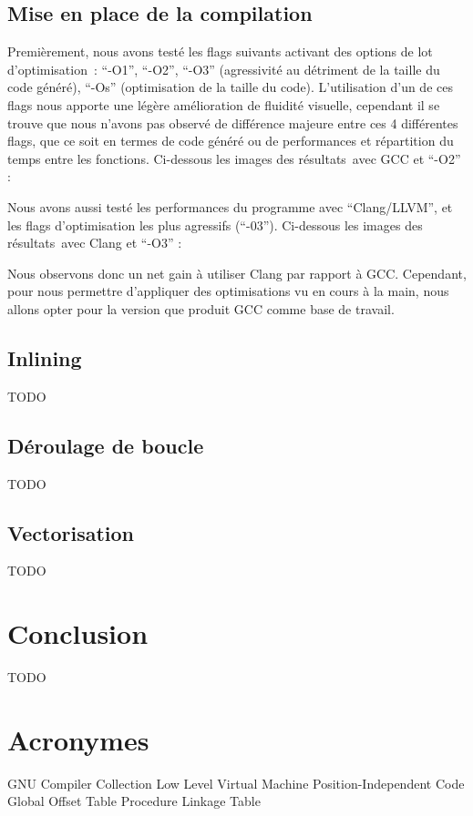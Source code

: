 \documentclass[12pt,a4paper]{article}
\begin{document}
\subsection{Mise en place de la compilation}
\label{sub.optim.compil}

Premièrement, nous avons testé les flags suivants activant des options de lot
d’optimisation : \enquote{-O1}, \enquote{-O2}, \enquote{-O3} (agressivité au
détriment de la taille du code généré), \enquote{-Os} (optimisation de la taille
du code). L’utilisation d’un de ces flags nous apporte une légère amélioration
de fluidité visuelle, cependant il se trouve que nous n’avons pas observé de
différence majeure entre ces 4 différentes flags, que ce soit en termes de code
généré ou de performances et répartition du temps entre les fonctions.
Ci-dessous les images des résultats avec \ac{GCC} et \enquote{-O2} :

Nous avons aussi testé les performances du programme avec
\enquote{Clang/\ac{LLVM}}, et les flags d’optimisation les plus agressifs
(\enquote{-03}). Ci-dessous les images des résultats avec Clang et \enquote{-O3}
:

Nous observons donc un net gain à utiliser Clang par rapport à \ac{GCC}.
Cependant, pour nous permettre d’appliquer des optimisations vu en cours à la
main, nous allons opter pour la version que produit \ac{GCC} comme base de
travail.

\subsection{Inlining}
\label{sub.optim.inlin}

TODO

\subsection{Déroulage de boucle}
\label{sub.optim.unrol}

TODO

\subsection{Vectorisation}
\label{sub.optim.vec}

TODO

\section{Conclusion}
\label{sec.conc}

TODO

\newpage
\section*{Acronymes}
\label{sec.acro}

\begin{acronym}
      {GNU Compiler Collection}
     {Low Level Virtual Machine}
      {Position-Independent Code}
      {Global Offset Table}
      {Procedure Linkage Table}
\end{acronym}
\end{document}
